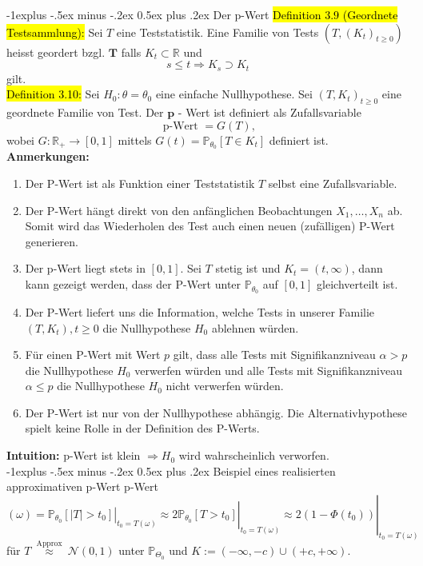 \documentclass[10pt,landscape]{article}
\makeatletter
\newcommand{\blue}[1]{\sethlcolor{cyan} \hl{#1}}
\renewcommand{\subsection}{\@startsection{subsection}{1}{0mm}%
                                {-1ex plus -.5ex minus -.2ex}%
                                {0.5ex plus .2ex}%
                                {\normalfont\large\bfseries}}
\renewcommand{\subsection}{\@startsection{subsection}{2}{0mm}%
                                {-1explus -.5ex minus -.2ex}%
                                {0.5ex plus .2ex}%
                                {\normalfont\normalsize\bfseries}}
\makeatother
\begin{document}
\begin{multicols}{3}
\subsection{Der p-Wert}
\blue{Definition $3.9$ (Geordnete Testsammlung):} Sei $T$ eine Teststatistik. Eine Familie von Tests $\left(T,\left(K_{t}\right)_{t \geq 0}\right)$ heisst geordert bzgl. $\boldsymbol{T}$ falls $K_{t} \subset \mathbb{R}$ und
$$
s \leq t \Longrightarrow K_{s} \supset K_{t}
$$
gilt. \\
\blue{Definition 3.10:} Sei $H_{0}: \theta=\theta_{0}$ eine einfache Nullhypothese. Sei $\left(T, K_{t}\right)_{t \geq 0}$ eine geordnete Familie von Test. Der $\boldsymbol{p}$ - Wert ist definiert als Zufallsvariable
$$
\text { p-Wert }=G(T),
$$
wobei $G: \mathbb{R}_{+} \rightarrow[0,1]$ mittels $G(t)=\mathbb{P}_{\theta_{0}}\left[T \in K_{t}\right]$ definiert ist. \\
\textbf{Anmerkungen:}
\begin{enumerate}
    \item Der P-Wert ist als Funktion einer Teststatistik $T$ selbst eine Zufallsvariable.
    \item Der P-Wert hängt direkt von den anfänglichen Beobachtungen $X_{1}, \ldots, X_{n}$ ab. Somit wird das Wiederholen des Test auch einen neuen (zufälligen) P-Wert generieren.
    \item Der p-Wert liegt stets in $[0,1]$. Sei $T$ stetig ist und $K_{t}=(t, \infty)$, dann kann gezeigt werden, dass der $\mathrm{P}$-Wert unter $\mathbb{P}_{\theta_{0}}$ auf $[0,1]$ gleichverteilt ist.
    \item Der P-Wert liefert uns die Information, welche Tests in unserer Familie $\left(T, K_{t}\right), t \geq 0$ die Nullhypothese $H_{0}$ ablehnen würden.
    \item Für einen P-Wert mit Wert $p$ gilt, dass alle Tests mit Signifikanzniveau $\alpha>p$ die Nullhypothese $H_{0}$ verwerfen würden und alle Tests mit Signifikanzniveau $\alpha \leq p$ die Nullhypothese $H_{0}$ nicht verwerfen würden.
    \item Der P-Wert ist nur von der Nullhypothese abhängig. Die Alternativhypothese spielt keine Rolle in der Definition des P-Werts.
\end{enumerate}
\textbf{Intuition:} $\mathrm{p}$-Wert ist klein $\Longrightarrow H_{0}$ wird wahrscheinlich verworfen.\\
\subsection{Beispiel eines realisierten approximativen p-Wert}
p-Wert $(\omega)=\left.\left.\left.\mathbb{P}_{\theta_{0}}\left[|T|>t_{0}\right]\right|_{t_{0}=T(\omega)} \approx 2 \mathbb{P}_{\theta_{0}}\left[T>t_{0}\right]\right|_{t_{0}=T(\omega)} \approx 2\left(1-\Phi\left(t_{0}\right)\right)\right|_{t_{0}=T(\omega)}$ 
für $T \stackrel{\text { Approx }}{\approx} \mathcal{N}(0,1)$ unter $\mathbb{P}_{\Theta_{0}}$ und $K:=(-\infty,-c) \cup(+c,+\infty)$.

\end{multicols}
\end{document}

